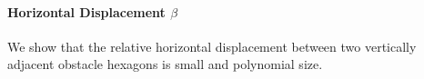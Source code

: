 \paragraph{Horizontal Displacement $\beta$}

We show that the relative horizontal displacement between two vertically adjacent obstacle hexagons is small and polynomial size.
